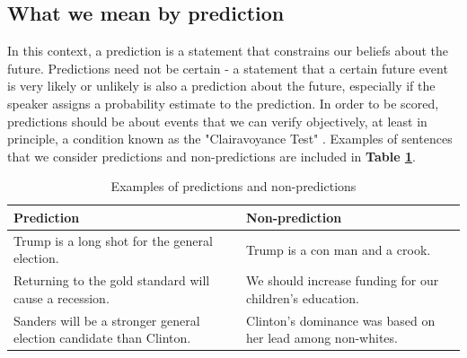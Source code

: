 \documentclass[11pt,letterpaper]{article}
\begin{document}
\subsection{What we mean by prediction}
In this context, a prediction is a statement that constrains our beliefs about the future. Predictions need not be certain - a statement that a certain future event is very likely or unlikely is also a prediction about the future, especially if the speaker assigns a probability estimate to the prediction. In order to be scored, predictions should be about events that we can verify objectively, at least in principle, a condition known as the "Clairavoyance Test" \cite{Tetlock:15}. Examples of sentences that we consider predictions and non-predictions are included in \textbf{Table \ref{predictions}}.
\begin{table}
\centering
 \begin{tabular}{| p{3.5cm} | p{3.5cm} |} 
 \hline
\textbf{Prediction} & \textbf{Non-prediction} \\
 \hline
\small{Trump is a long shot for the general election.} & \small{Trump is a con man and a crook.} \\
\hline
\small{Returning to the gold standard will cause a recession.}& \small{We should increase funding for our children's education.} \\
\hline
\small{Sanders will be a stronger general election candidate than Clinton.} & \small{Clinton's dominance was based on her lead among non-whites.} \\
 \hline
 \end{tabular}
 \caption{Examples of predictions and non-predictions}
 \label{predictions}
\end{table}
\end{document}

